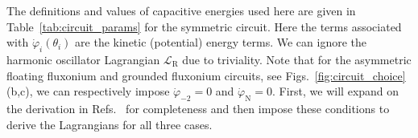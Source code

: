 \documentclass[%
reprint,
superscriptaddress,
 amsmath,amssymb,
 aps,
 prx,
longbibliography,
floatfix,
]{revtex4-2}
\begin{document}
The definitions and values of capacitive energies used here are given in Table~\ref{tab:circuit_params} for the symmetric circuit. Here the terms associated with $\dot{\varphi}_i (\theta_i)$ are the kinetic (potential) energy terms. We can ignore the harmonic oscillator Lagrangian $\mathcal{L}_\textrm{R}$ due to triviality. Note that for the asymmetric floating fluxonium and grounded fluxonium circuits, see Figs.~\ref{fig:circuit_choice}(b,c), we can respectively impose $\dot{\varphi}_{-2}=0$ and $\dot{\varphi}_{\textrm{N}}=0$. 
First, we will expand on the derivation in Refs.~\cite{ferguson2013symmetries,viola2015collective} for completeness and then impose these conditions to derive the Lagrangians for all three cases. 
\end{document}
